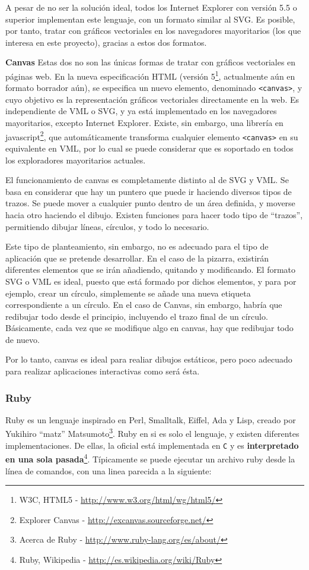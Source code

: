 A pesar de no ser la solución ideal, todos los Internet Explorer con versión 5.5 o superior implementan este lenguaje, con un formato similar al SVG. Es posible, por tanto, tratar con gráficos vectoriales en los navegadores mayoritarios (los que interesa en este proyecto), gracias a estos dos formatos. 

\textbf{Canvas}
Estas dos no son las únicas formas de tratar con gráficos vectoriales en páginas web. En la nueva especificación HTML (versión 5\footnote{W3C, HTML5 - \url{http://www.w3.org/html/wg/html5/}}, actualmente aún en formato borrador aún), se especifica un nuevo elemento, denominado \texttt{<canvas>}, y cuyo objetivo es la representación gráficos vectoriales directamente en la web. Es independiente de VML o SVG, y ya está implementado en los navegadores mayoritarios, excepto Internet Explorer. Existe, sin embargo, una librería en javascript\footnote{Explorer Canvas - \url{http://excanvas.sourceforge.net/}}, que automáticamente transforma cualquier elemento \texttt{<canvas>} en su equivalente en VML, por lo cual se puede considerar que es soportado en todos los exploradores mayoritarios actuales.

El funcionamiento de canvas es completamente distinto al de SVG y VML. Se basa en considerar que hay un puntero que puede ir haciendo diversos tipos de trazos. Se puede mover a cualquier punto dentro de un área definida, y moverse hacia otro haciendo el dibujo. Existen funciones para hacer todo tipo de ``trazos'', permitiendo dibujar líneas, círculos, y todo lo necesario.

Este tipo de planteamiento, sin embargo, no es adecuado para el tipo de aplicación que se pretende desarrollar. En el caso de la pizarra, existirán diferentes elementos que se irán añadiendo, quitando y modificando. El formato SVG o VML es ideal, puesto que está formado por dichos elementos, y para por ejemplo, crear un círculo, simplemente se añade una nueva etiqueta correspondiente a un círculo. En el caso de Canvas, sin embargo, habría que redibujar todo desde el principio, incluyendo el trazo final de un círculo. Básicamente, cada vez que se modifique algo en canvas, hay que redibujar todo de nuevo.

Por lo tanto, canvas es ideal para realiar dibujos estáticos, pero poco adecuado para realizar aplicaciones interactivas como será ésta.

\subsubsection{Ruby}
Ruby es un lenguaje inspirado en Perl, Smalltalk, Eiffel, Ada y Lisp, creado por Yukihiro ``matz'' Matsumoto\footnote{Acerca de Ruby - \url{http://www.ruby-lang.org/es/about/}}. Ruby en si es solo el lenguaje, y existen diferentes implementaciones. De ellas, la oficial está implementada en \texttt{C} y es \textbf{interpretado en una sola pasada}\footnote{Ruby, Wikipedia - \url{http://es.wikipedia.org/wiki/Ruby}}. Típicamente se puede ejecutar un archivo ruby desde la línea de comandos, con una linea parecida a la siguiente:

